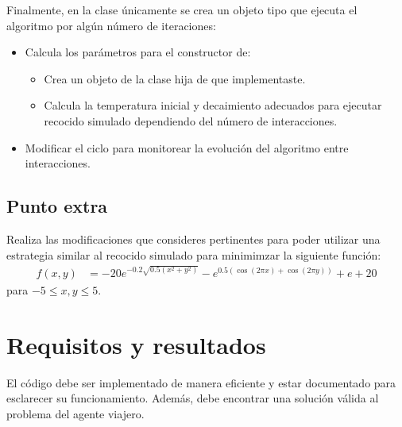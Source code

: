 Finalmente, en la clase  únicamente se crea un objeto tipo  que ejecuta el algoritmo por algún número de iteraciones:
\begin{itemize}
 \item Calcula los parámetros para el constructor de:
 
 \begin{itemize}
  \item Crea un objeto de la clase hija de  que implementaste.
  
  \item Calcula la temperatura inicial y decaimiento adecuados para ejecutar recocido simulado dependiendo del número de interacciones.
 \end{itemize}

 \item Modificar el ciclo para monitorear la evolución del algoritmo entre interacciones.
\end{itemize}


\subsection{Punto extra}

Realiza las modificaciones que consideres pertinentes para poder utilizar una estrategia similar al recocido simulado para minimimzar la siguiente función:
\begin{align*}
 f(x,y) &= -20 e^{-0.2 \sqrt{0.5(x^2 + y^2)}} - e^{0.5 (\cos(2 \pi x) + \cos(2 \pi y))} + e + 20
\end{align*}
para $-5 \leq x,y \leq 5$.


\section{Requisitos y resultados}

El código debe ser implementado de manera eficiente y estar documentado para esclarecer su funcionamiento.  Además, debe encontrar una solución válida al problema del agente viajero.
